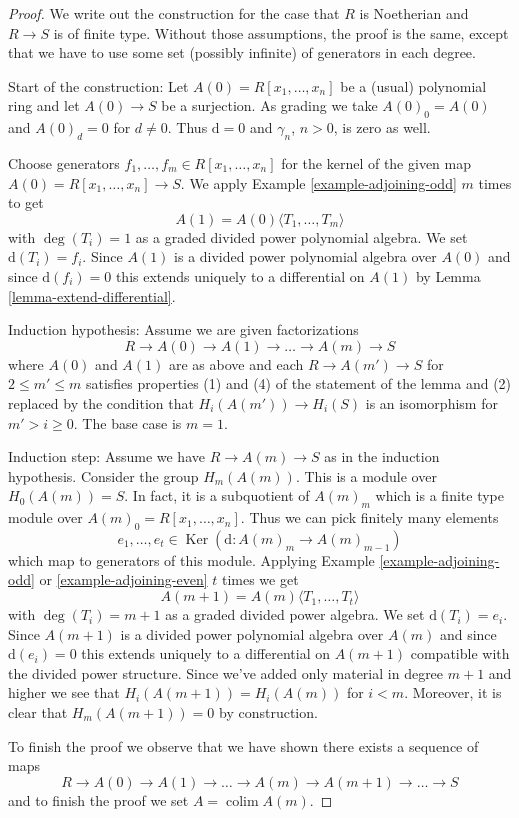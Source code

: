 \documentclass{stacks-project}
\theoremstyle{plain}
\theoremstyle{definition}
\theoremstyle{remark}
\numberwithin{equation}{subsection}
\def\colim{\mathop{\mathrm{colim}}\nolimits}
\def\Ker{\mathop{\mathrm{Ker}}}
\begin{document}
\begin{proof}
We write out the construction for the case that $R$ is Noetherian
and $R\to S$ is of finite type. Without those assumptions, the proof
is the same, except that we have to use some set (possibly
infinite) of generators in each degree.

\medskip\noindent
Start of the construction: Let $A(0) = R[x_1, \ldots, x_n]$ be
a (usual) polynomial ring and let $A(0) \to S$ be a surjection.
As grading we take $A(0)_0 = A(0)$ and $A(0)_d = 0$ for $d \not = 0$.
Thus $\text{d} = 0$ and $\gamma_n$, $n > 0$, is zero as well.

\medskip\noindent
Choose generators $f_1, \ldots, f_m \in R[x_1, \ldots, x_n]$
for the kernel of the given map $A(0) = R[x_1, \ldots, x_n] \to S$.
We apply Example \ref{example-adjoining-odd} $m$ times to get
$$
A(1) = A(0)\langle T_1, \ldots, T_m\rangle
$$
with $\deg(T_i) = 1$ as a graded divided power polynomial algebra.
We set $\text{d}(T_i) = f_i$. Since $A(1)$ is a divided power polynomial
algebra over $A(0)$ and since $\text{d}(f_i) = 0$
this extends uniquely to a differential on $A(1)$ by
Lemma \ref{lemma-extend-differential}.

\medskip\noindent
Induction hypothesis: Assume we are given factorizations
$$
R \to A(0) \to A(1) \to \ldots \to A(m) \to S
$$
where $A(0)$ and $A(1)$ are as above and each $R \to A(m') \to S$
for $2 \leq m' \leq m$ satisfies properties (1) and (4)
of the statement of the lemma and (2) replaced by the condition that
$H_i(A(m')) \to H_i(S)$ is an isomorphism for
$m' > i \geq 0$. The base case is $m = 1$.

\medskip\noindent
Induction step: Assume we have $R \to A(m) \to S$
as in the induction hypothesis. Consider the
group $H_m(A(m))$. This is a module over $H_0(A(m)) = S$.
In fact, it is a subquotient of $A(m)_m$ which is a finite
type module over $A(m)_0 = R[x_1, \ldots, x_n]$.
Thus we can pick finitely many elements
$$
e_1, \ldots, e_t \in \Ker(\text{d} : A(m)_m \to A(m)_{m - 1})
$$
which map to generators of this module. Applying
Example \ref{example-adjoining-odd} or
\ref{example-adjoining-even} $t$ times we get
$$
A(m + 1) = A(m)\langle T_1, \ldots, T_t\rangle
$$
with $\deg(T_i) = m + 1$ as a graded divided power algebra. We set
$\text{d}(T_i) = e_i$. Since $A(m+1)$ is a divided power polynomial
algebra over $A(m)$ and since $\text{d}(e_i) = 0$
this extends uniquely to a differential on $A(m + 1)$
compatible with the divided power structure.
Since we've added only material in degree $m + 1$ and higher we see
that $H_i(A(m + 1)) = H_i(A(m))$ for $i < m$. Moreover, it is
clear that $H_m(A(m + 1)) = 0$ by construction.

\medskip\noindent
To finish the proof we observe that we have shown there exists
a sequence of maps
$$
R \to A(0) \to A(1) \to \ldots \to A(m) \to A(m + 1) \to \ldots \to S
$$
and to finish the proof we set $A = \colim A(m)$.
\end{proof}
\end{document}
